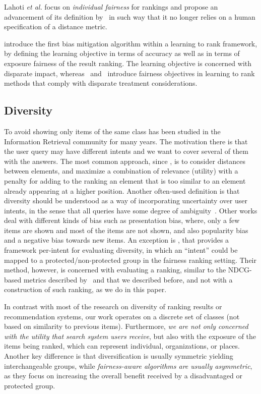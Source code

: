 Lahoti {\em et al.} \citet{lahoti2019operationalizing} focus on \emph{individual fairness} for rankings and propose an advancement of its definition by~\citet{Dwork2012} in such way that it no longer relies on a human specification of a distance metric.

\citet{zehlike2018reducing} introduce the first bias mitigation algorithm within a learning to rank framework, by defining the learning objective in terms of accuracy as well as in terms of exposure fairness of the result ranking.
%
The learning objective is concerned with disparate impact, whereas~\citet{beutel2019fairness} and~\citet{singh2019policy} introduce fairness objectives in learning to rank methods that comply with disparate treatment considerations.

\subsection{Diversity}

To avoid showing only items of the same class has been studied in the Information Retrieval community for many years. The motivation there is that the user query may have different intents and we want to cover several of them with the answers.
%
The most common approach, since \citet{carbonell1998use}, is to consider distances between elements, and maximize a combination of relevance (utility) with a penalty for adding to the ranking an element that is too similar to an element already appearing at a higher position.
%
Another often-used definition is that diversity should be understood as a way of incorporating uncertainty over user intents, in the sense that all queries have some degree of ambiguity~\cite{agrawal2009diversifying}.
%
Other works \citet{kunaver2017diversity,channamsetty2017recommender} deal with different kinds of bias such as presentation bias, where, only a few items are shown and most of the items are not shown, and also popularity bias and a negative bias towards new items.
%
An exception is \citet{sakai2011evaluating}, that provides a framework per-intent for evaluating diversity, in which an ``intent'' could be mapped to a protected/non-protected group in the fairness ranking setting. Their method, however, is concerned with evaluating a ranking, similar to the NDCG-based metrics described by~\citet{yang2016measuring} and that we described before, and not with a construction of such ranking, as we do in this paper.

In contrast with most of the research on diversity of ranking results or recommendation systems, our work operates on a discrete set of classes (not based on similarity to previous items).
%
Furthermore, \emph{we are not only concerned with the utility that search system users receive}, but also with the exposure of the items being ranked, which can represent individual, organizations, or places.
%
Another key difference is that diversification is usually symmetric yielding interchangeable groups, while \emph{fairness-aware algorithms are usually asymmetric}, as they focus on increasing the overall benefit received by a disadvantaged or protected group.
